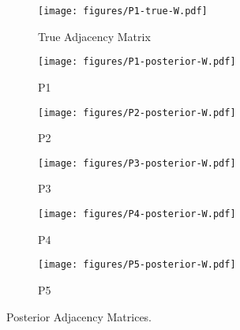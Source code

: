 \begin{figure}[t]
	\centering
	\begin{subfigure}{0.31\textwidth}
		\centering
		\texttt{[image: figures/P1-true-W.pdf]}
		\caption{True Adjacency Matrix}
	\end{subfigure}
	\begin{subfigure}{0.31\textwidth}
		\centering
		\texttt{[image: figures/P1-posterior-W.pdf]}
		\caption{P1}
	\end{subfigure}
	\begin{subfigure}{0.31\textwidth}
		\centering
		\texttt{[image: figures/P2-posterior-W.pdf]}
		\caption{P2}
	\end{subfigure}
	\begin{subfigure}{0.31\textwidth}
		\centering
		\texttt{[image: figures/P3-posterior-W.pdf]}
		\caption{P3}
	\end{subfigure}
	\begin{subfigure}{0.31\textwidth}
		\centering
		\texttt{[image: figures/P4-posterior-W.pdf]}
		\caption{P4}
	\end{subfigure}
	\begin{subfigure}{0.31\textwidth}
		\centering
		\texttt{[image: figures/P5-posterior-W.pdf]}
		\caption{P5}
	\end{subfigure}
	\caption{Posterior Adjacency Matrices.}
	\label{fig:P-posterior}
\end{figure}

